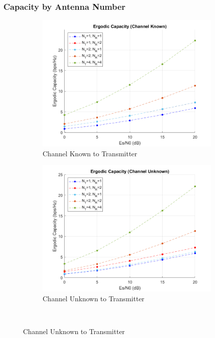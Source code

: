 \documentclass{article}
\begin{document}
\subsubsection{Capacity by Antenna Number}
\begin{figure}[H]
	\centering
	\begin{subfigure}{0.5\textwidth}
		\centerline{\includegraphics[width=1\textwidth]{b_ergodic_ck.png}}
		\caption{Channel Known to Transmitter}
	\end{subfigure}%
	\begin{subfigure}{0.5\textwidth}
		\centerline{\includegraphics[width=1\textwidth]{b_ergodic_cu.png}}
		\caption{Channel Unknown to Transmitter}
	\end{subfigure}\\%

\end{figure}
\end{document}
